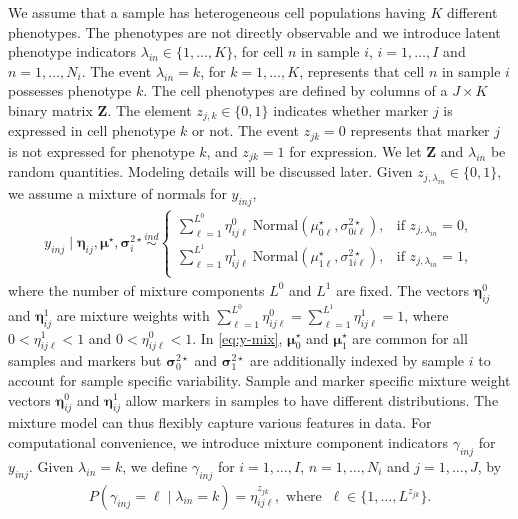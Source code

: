 \documentclass[12pt,]{article}
\newcommand{\ind}{\overset{ind}{\sim}}
\def\bet{\bm{\eta}}
\def\lin{\lambda_{in}}
\def\Z{\bm{Z}}
\def\bmu{\bm{\mu}}
\def\bsig{\bm{\sigma}}
\begin{document}
We assume that a sample has heterogeneous cell populations having $K$ different
phenotypes.  The phenotypes are not directly observable and we introduce latent
phenotype indicators \(\lambda_{in} \in \{1, \ldots, K\}\), for cell $n$ in
sample $i$, \(i=1, \ldots, I\) and \(n=1, \ldots, N_i\).  The event
$\lambda_{in}=k$, for $k=1, \ldots, K$, represents that cell $n$ in sample $i$
possesses phenotype $k$.  The cell phenotypes are defined by columns of a $J
\times K$ binary matrix $\Z$. The element \(z_{j, k} \in \{0, 1\}\)
indicates whether marker \(j\) is expressed in cell phenotype \(k\) or not. The
event \(z_{jk}=0\) represents that marker \(j\) is not expressed for phenotype
$k$, and \(z_{jk}=1\) for expression. We let $\Z$ and $\lambda_{in}$ be random
quantities. Modeling details will be discussed later.  Given \(z_{j,
\lambda_{in}} \in \{0, 1\}\), we assume a mixture of normals for \(y_{inj}\),
%
\begin{align}
y_{inj} \mid \bet_{ij}, \bmu^\star, \bsig^{2 \star}_{i} \ind
\begin{cases}
  \sum_{\ell=1}^{L^0} \eta^0_{ij\ell}~ \text{Normal}(\mu^\star_{0\ell}, \sigma^{2 \star}_{0i\ell}), &\mbox{if $z_{j,\lambda_{in}}=0$},\\
  \sum_{\ell=1}^{L^1} \eta^1_{ij\ell}~ \text{Normal}(\mu^\star_{1\ell}, \sigma^{2 \star}_{1i\ell}), &\mbox{if $z_{j,\lambda_{in}}=1$},\\
\end{cases} \label{eq:y-mix}
\end{align}
where the number of mixture components \(L^0\) and \(L^1\) are fixed.  The
vectors $\bet^0_{ij}$ and $\bet^1_{ij}$ are mixture weights with
\(\sum_{\ell=1}^{L^0} \eta^0_{ij\ell}=\sum_{\ell=1}^{L^1}\eta^1_{ij\ell}=1\),
where \(0 < \eta^1_{ij\ell} < 1\) and \(0 < \eta^0_{ij\ell} < 1\).  In
\eqref{eq:y-mix}, $\bmu^\star_0$ and $\bmu^\star_1$ are common for all samples
and markers but $\bsig^{2\star}_0$ and $\bsig^{2\star}_1$ are additionally
indexed by sample $i$ to account for sample specific variability.  Sample and
marker specific mixture weight vectors $\bet^0_{ij}$ and $\bet^1_{ij}$ allow
markers in samples to have different distributions. The mixture model can thus
flexibly capture various features in data.  For computational convenience, we
introduce mixture component indicators $\gamma_{inj}$ for $y_{inj}$.  Given
$\lambda_{in}=k$, we define \(\gamma_{inj}\) for \(i=1, \ldots, I\), \(n=1,
\ldots, N_i\) and \(j=1, \ldots, J\), by
\begin{eqnarray}
P(\gamma_{inj} = \ell \mid \lin=k)=\eta^{z_{jk}}_{ij\ell}, \mbox{ where }~ \ell \in \{1,\ldots, L^{z_{jk}}\}. \label{eq:gam}
\end{eqnarray}
\end{document}
